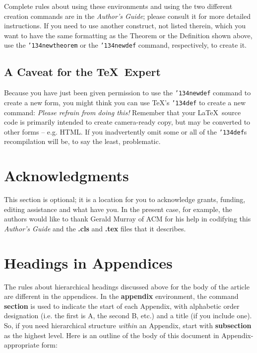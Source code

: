 \documentclass{sig-alternate}
\begin{document}
Complete rules about using these environments and using the
two different creation commands are in the
\textit{Author's Guide}; please consult it for more
detailed instructions.  If you need to use another construct,
not listed therein, which you want to have the same
formatting as the Theorem
or the Definition\cite{salas:calculus} shown above,
use the \texttt{{\char'134}newtheorem} or the
\texttt{{\char'134}newdef} command,
respectively, to create it.

\subsection*{A {\secit Caveat} for the \TeX\ Expert}
Because you have just been given permission to
use the \texttt{{\char'134}newdef} command to create a
new form, you might think you can
use \TeX's \texttt{{\char'134}def} to create a
new command: \textit{Please refrain from doing this!}
Remember that your \LaTeX\ source code is primarily intended
to create camera-ready copy, but may be converted
to other forms -- e.g. HTML. If you inadvertently omit
some or all of the \texttt{{\char'134}def}s recompilation will
be, to say the least, problematic.

\section{Acknowledgments}
This section is optional; it is a location for you
to acknowledge grants, funding, editing assistance and
what have you.  In the present case, for example, the
authors would like to thank Gerald Murray of ACM for
his help in codifying this \textit{Author's Guide}
and the \textbf{.cls} and \textbf{.tex} files that it describes.

%

%
%
\appendix
\section{Headings in Appendices}
The rules about hierarchical headings discussed above for
the body of the article are different in the appendices.
In the \textbf{appendix} environment, the command
\textbf{section} is used to
indicate the start of each Appendix, with alphabetic order
designation (i.e. the first is A, the second B, etc.) and
a title (if you include one).  So, if you need
hierarchical structure
\textit{within} an Appendix, start with \textbf{subsection} as the
highest level. Here is an outline of the body of this
document in Appendix-appropriate form:
\end{document}

